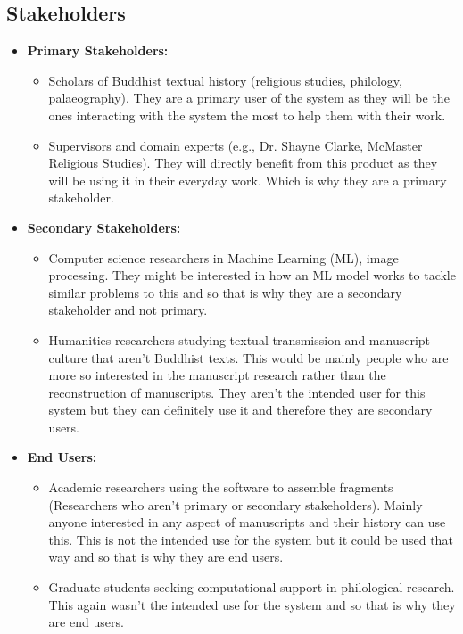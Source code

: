 \documentclass{article}
\begin{document}
\subsection{Stakeholders}
\begin{itemize}
    \item \textbf{Primary Stakeholders:}
    \begin{itemize} 
        \item Scholars of Buddhist textual history (religious studies, philology, palaeography). They are a primary user of the system as they will be the ones interacting with the system the most to help them with their work.
        \item Supervisors and domain experts (e.g., Dr. Shayne Clarke, McMaster Religious Studies). They will directly benefit from this product as they will be using it in their everyday work. Which is why they are a primary stakeholder.
    \end{itemize}

    \item \textbf{Secondary Stakeholders:}
    \begin{itemize} 
        \item Computer science researchers in Machine Learning (ML), image processing. They might be interested in how an ML model works to tackle similar problems to this and so that is why they are a secondary stakeholder and not primary.
        \item Humanities researchers studying textual transmission and manuscript culture that aren't Buddhist texts. This would be mainly people who are more so interested in the manuscript research rather than the reconstruction of manuscripts. They aren't the intended user for this system but they can definitely use it and therefore they are secondary users.
    \end{itemize}
    
    \item \textbf{End Users:}
    \begin{itemize} 
        \item Academic researchers using the software to assemble fragments (Researchers who aren't primary or secondary stakeholders). Mainly anyone interested in any aspect of manuscripts and their history can use this. This is not the intended use for the system but it could be used that way and so that is why they are end users.
        \item Graduate students seeking computational support in philological research. This again wasn't the intended use for the system and so that is why they are end users.
    \end{itemize}
\end{itemize}
\end{document}
